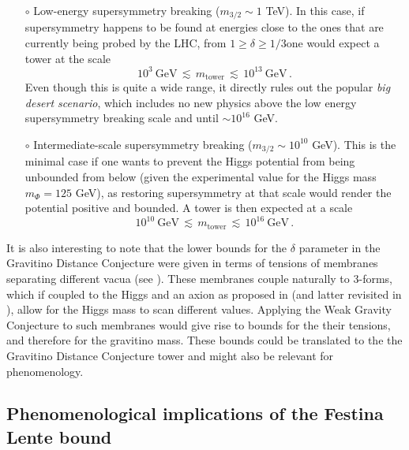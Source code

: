 \documentclass[11pt,a4paper]{article}
\begin{document}
\begin{itemize}
\item[$\circ$]{ Low-energy supersymmetry breaking ($m_{3/2} \sim 1$ TeV). In this case, if supersymmetry happens to be found at energies close to the ones that are currently being probed by the LHC, from $1\geq \delta \geq 1/3$one would expect a tower at the scale
\begin{equation}
 10^3\ \text{GeV} \, \lesssim \,m_{\mathrm{tower}} \, \lesssim \, 10^{13} \  \text{GeV}\, . 
 \end{equation}
 Even though this is quite a wide range, it directly rules out the popular \emph{big desert scenario}, which includes no new physics above the low energy supersymmetry breaking scale and until $\sim 10^{16}$ GeV.
  }
 
 \item[$\circ$]{Intermediate-scale supersymmetry breaking ($m_{3/2} \sim 10^{10}$ GeV). This is the minimal case if one wants to prevent the Higgs potential from being unbounded from below (given the experimental value for the Higgs mass $m_{\Phi}=125$ GeV), as restoring supersymmetry at that scale would  render the potential positive and bounded. A tower is then expected at a scale
\begin{equation}
 10^{10}\ \text{GeV} \, \lesssim \,m_{\mathrm{tower}} \, \lesssim \, 10^{16} \  \text{GeV}\, . 
 \end{equation}
  }
\end{itemize}

It is also interesting to note that the lower bounds for the $\delta$ parameter in the Gravitino Distance Conjecture were given in terms of tensions of membranes separating different vacua (see \cite{Castellano:2021yye}). These membranes couple naturally to 3-forms, which if coupled to the Higgs and an axion as proposed in \cite{Herraez:2016dxn} (and latter revisited in \cite{Giudice:2019iwl,Kaloper:2019xfj,Lee:2019efp,Dvali:2019mhn}), allow for the Higgs mass to scan different values. Applying the Weak Gravity Conjecture to such membranes would give rise to bounds for the their tensions, and therefore for the gravitino mass. These bounds could be translated to the the Gravitino Distance Conjecture tower and might also be relevant for phenomenology.


\subsection{Phenomenological implications of the Festina Lente bound}
\label{ss:FLpheno}
\end{document}
